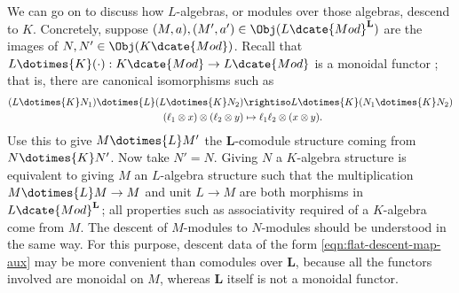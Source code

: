 \begin{remark}\label{rem:flat-descent-alg}
	We can go on to discuss how $L$-algebras, or modules over those algebras,
	descend to $K$. Concretely, suppose
	$(M,a),(M',a')\in\Obj(L\dcate{Mod}^{\mathbf{L}})$ are the images of
	$N,N'\in\Obj(K\dcate{Mod})$. Recall that
	$L\dotimes{K}(\mathord\cdot):K\dcate{Mod}\to L\dcate{Mod}$ is a
	monoidal functor \cite[Proposition 6.6.10]{Li1}; that is, there are
	canonical isomorphisms such as
	\begin{equation}\label{eqn:change-of-ring-monoidal}\begin{aligned}
			(L \dotimes{K} N_1) \dotimes{L} (L \dotimes{K} N_2) & \rightiso L \dotimes{K} (N_1 \dotimes{K} N_2) \\
			(\ell_1 \otimes x) \otimes (\ell_2 \otimes y) & \mapsto \ell_1 \ell_2 \otimes (x \otimes y).
	\end{aligned}\end{equation}
	Use this to give $M\dotimes{L}M'$ the $\mathbf{L}$-comodule structure
	coming from $N\dotimes{K}N'$. Now take $N'=N$. Giving $N$ a
	$K$-algebra structure is equivalent to giving $M$ an $L$-algebra
	structure such that the multiplication $M\dotimes{L}M\to M$ and unit
	$L\to M$ are both morphisms in $L\dcate{Mod}^{\mathbf{L}}$; all
	properties such as associativity required of a $K$-algebra come from $M$.
	The descent of $M$-modules to $N$-modules should be understood in the same
	way. For this purpose, descent data of the form
	\eqref{eqn:flat-descent-map-aux} may be more convenient than comodules over
	$\mathbf{L}$, because all the functors involved are monoidal on $M$,
	whereas $\mathbf{L}$ itself is not a monoidal functor.
\end{remark}
